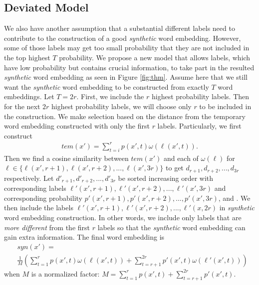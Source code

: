 \documentclass[11pt,letterpaper]{article}
\begin{document}
\subsection{Deviated Model}\label{model:deviated}
We also have another assumption that a substantial different labels need to contribute to the construction of a good {\em synthetic} word embedding. However, some of those labels may get too small probability that they are not included in the top highest $T$ probability. We propose a new model that allows labels, which have low probability but contains crucial information, to take part in the resulted {\em synthetic} word embedding as seen in Figure \ref{fig:thm}. Assume here that we still want the {\em synthetic} word embedding to be constructed from exactly $T$ word embeddings. Let $T = 2r$. First, we include the $r$ highest probability labels. Then for the next $2r$ highest probability labels, we will choose only $r$ to be included in the construction. We make selection based on the distance from the temporary word embedding constructed with only the first $r$ labels. Particularly, we first construct 
\begin{align*}
tem(x') = \sum\limits_{t=i}^r p(x',t)\omega(\ell(x',t)).
\end{align*}
Then we find a cosine similarity between $tem(x')$ and each of $\omega(\ell)$ for $\ell \in \{ \ell(x',r+1), \ell(x',r+2),...,\ell(x',3r) \}$ to get $d_{r+1},d_{r+2},...,d_{3r}$ respectively. Let $d'_{r+1}, d'_{r+2},...,d'_{3r}$ be sorted increasing order with corresponding labels $\ell'(x',r+1), \ell'(x',r+2), ..., \ell'(x',3r)$ and corresponding probability $p'(x',r+1), p'(x',r+2), ..., p'(x',3r)$, and . We then include the labels $\ell'(x',r+1), \ell'(x',r+2),..., \ell'(x,2r)$  in {\em synthetic} word embedding construction. In other words, we include only labels that are {\em more different } from the first $r$ labels so that the {\em synthetic} word embedding can gain extra information. The final word embedding is 
\begin{align*}
&syn(x') = \\
& \frac{1}{M} \left( \sum\limits_{t=1}^r p(x',t)\omega(\ell(x',t)) + \sum\limits_{t=r+1}^{2r} p'(x',t)\omega(\ell'(x',t)) \right)
\end{align*}
when $M$ is a normalized factor: $M = \sum_{t=1}^r p(x',t) + \sum_{t=r+1}^{2r} p'(x',t)$.
\end{document}
